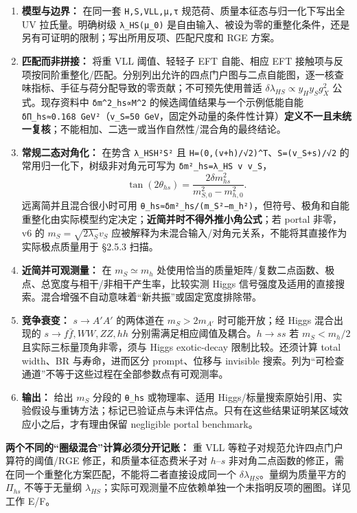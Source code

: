 \documentclass[
]{article}
\providecommand{\tightlist}{%
  \setlength{\itemsep}{0pt}\setlength{\parskip}{0pt}}
\begin{document}
\begin{enumerate}
\def\labelenumi{\arabic{enumi}.}
\tightlist
\item
  \textbf{模型与边界：} 在同一套 \texttt{H,S,VLL,μ,τ}
  规范荷、质量本征态与归一化下写出全 UV 拉氏量。明确树级
  \texttt{λ\_HS(μ\_0)}
  是自由输入、被设为零的重整化条件，还是另有可证明的限制；写出所用反项、匹配尺度和
  RGE 方案。
\item
  \textbf{匹配而非拼接：} 将重 VLL 阈值、轻轻子 EFT 自能、相应 EFT
  接触项与反项按同阶重整化/匹配。分别列出允许的四点门户图与二点自能图，逐一核查味指标、手征与荷分配导致的零贡献；不可预先使用普适
  \(\delta\lambda_{HS}\propto y_Hy_Sg_X^2\) 公式。现存资料中
  \texttt{δm\^{}2\_hs∝M\^{}2} 的候选阈值结果与一个示例低能自能
  \texttt{\textbar{}δΠ\_hs\textbar{}≈0.168\ GeV²}（\texttt{v\_S=50\ GeV}，固定外动量的条件性计算）\textbf{定义不一且未统一复核}；不能相加、二选一或当作自然性/混合角的最终结论。
\item
  \textbf{常规二态对角化：} 在势含
  \texttt{λ\_HS\textbar{}H\textbar{}²\textbar{}S\textbar{}²} 且
  \texttt{H=(0,(v+h)/√2)\^{}T}、\texttt{S=(v\_S+s)/√2}
  的常用归一化下，树级非对角元可写为 \texttt{δm²\_hs=λ\_HS\ v\ v\_S}，
  \[
  \tan(2\theta_{hs})=\frac{2\delta m_{hs}^2}{m_{S,0}^2-m_{h,0}^2}.
  \] 远离简并且混合很小时可用
  \texttt{θ\_hs≈δm²\_hs/(m\_S²−m\_h²)}，但符号、极角和自能重整化由实际模型约定决定；\textbf{近简并时不得外推小角公式}；若
  portal 非零，v6 的 \(m_S=\sqrt{2\lambda_S}v_S\)
  应被解释为未混合输入/对角元关系，不能将其直接作为实际极点质量用于
  §2.5.3 扫描。
\item
  \textbf{近简并可观测量：} 在 \(m_S\simeq m_h\)
  处使用恰当的质量矩阵/复数二点函数、极点、总宽度与相干/非相干产生率，比较实测
  Higgs
  信号强度及适用的直接搜索。混合增强不自动意味着``新共振''或固定宽度排除带。
\item
  \textbf{竞争衰变：} \(s\to A'A'\) 的两体道在 \(m_S>2m_{A'}\)
  时可能开放；经 Higgs 混合出现的 \(s\to f\bar f,WW,ZZ,hh\)
  分别需满足相应阈值及耦合。\(h\to ss\) 若 \(m_S<m_h/2\)
  且实际三标量顶角非零，须与 Higgs exotic-decay 限制比较。还须计算 total
  width、BR 与寿命，进而区分 prompt、位移与 invisible
  搜索。列为``可检查通道''不等于这些过程在全部参数点有可观测率。
\item
  \textbf{输出：} 给出 \(m_S\) 分段的 \texttt{θ\_hs} 或物理率、适用
  Higgs/标量搜索原始引用、实验假设与重铸方法；标记已验证点与未评估点。只有在这些结果证明某区域效应小之后，才有理由保留
  negligible portal benchmark。
\end{enumerate}

\textbf{两个不同的``圈级混合''计算必须分开记账：} 重 VLL
等粒子对规范允许四点门户算符的阈值/RGE 修正，和质量本征态费米子对
\(h\)--\(s\)
非对角二点函数的修正，需在同一个重整化方案匹配，不能将二者直接设成同一个
\(\delta\lambda_{HS}\)。量纲为质量平方的 \(\Pi_{hs}\) 不等于无量纲
\(\lambda_{HS}\)；实际可观测量不应依赖单独一个未指明反项的圈图。详见工作
E/F。
\end{document}
